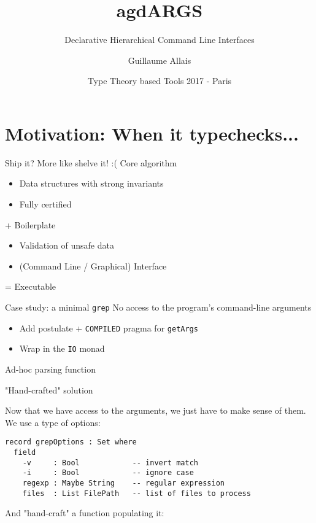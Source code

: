 \documentclass[dvipsnames]{beamer}
\title{agdARGS}
\subtitle{Declarative Hierarchical Command Line Interfaces}
\author[G. Allais]{Guillaume Allais}
\institute[Radboud]{Radboud University}
\date[TTT 17]{Type Theory based Tools 2017 - Paris}
\begin{document}
\begin{frame}
 \maketitle
\end{frame}

\section{Motivation: When it typechecks...}

\begin{frame}{Ship it? More like shelve it! :(}
  Core algorithm
    \begin{itemize}
      \item Data structures with strong invariants
      \item Fully certified
    \end{itemize}
  + Boilerplate
    \begin{itemize}
      \item Validation of unsafe data
      \item (Command Line / Graphical) Interface
    \end{itemize}
  = Executable
\end{frame}

\begin{frame}{Case study: a minimal \texttt{grep}}
No access to the program's command-line arguments
  \begin{itemize}
    \item Add postulate + \texttt{COMPILED} pragma for \texttt{getArgs}
    \item Wrap in the \texttt{IO} monad
  \end{itemize}
Ad-hoc parsing function
\end{frame}

\begin{frame}[fragile]{"Hand-crafted" solution}

Now that we have access to the arguments, we just have to make sense
of them. We use a type of options:

\begin{verbatim}
record grepOptions : Set where
  field
    -v     : Bool            -- invert match
    -i     : Bool            -- ignore case
    regexp : Maybe String    -- regular expression
    files  : List FilePath   -- list of files to process
\end{verbatim}

And "hand-craft" a function populating it:
\end{frame}
\end{document}
